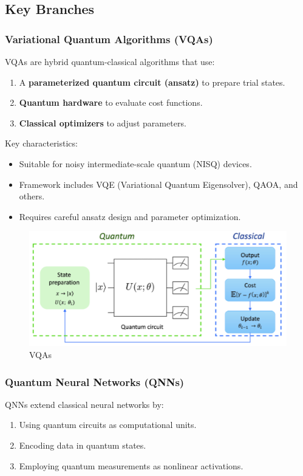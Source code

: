 \documentclass[pre,twocolumn,floatfix]{revtex4-1}
\begin{document}
\subsection{Key Branches}
\subsubsection{Variational Quantum Algorithms (VQAs)}
VQAs are hybrid quantum-classical algorithms that use:
\begin{enumerate}
    \item A \textbf{parameterized quantum circuit (ansatz)} to prepare trial states.
    \item \textbf{Quantum hardware} to evaluate cost functions.
    \item \textbf{Classical optimizers} to adjust parameters.
\end{enumerate}

Key characteristics:
\begin{itemize}
    \item Suitable for noisy intermediate-scale quantum (NISQ) devices.
    \item Framework includes VQE (Variational Quantum Eigensolver), QAOA, and others.
    \item Requires careful ansatz design and parameter optimization.
\end{itemize}

\begin{figure}[H]
    \centering
    \includegraphics[width=0.5\linewidth]{images/qml.png}
    \caption{VQAs}
    \label{2}
\end{figure}

\subsubsection{Quantum Neural Networks (QNNs)}
QNNs extend classical neural networks by:
\begin{enumerate}
    \item Using quantum circuits as computational units.
    \item Encoding data in quantum states.
    \item Employing quantum measurements as nonlinear activations.
\end{enumerate}
\end{document}
